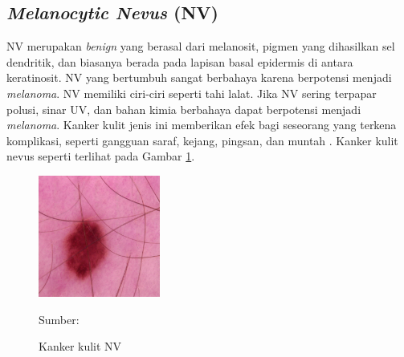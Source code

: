     \subsection{\textit{Melanocytic Nevus} (NV)}
    NV merupakan \textit{benign} yang berasal dari melanosit, pigmen yang dihasilkan sel dendritik, dan biasanya berada pada lapisan basal epidermis di antara keratinosit. NV yang bertumbuh sangat berbahaya karena berpotensi menjadi \textit{melanoma}. NV memiliki ciri-ciri seperti tahi lalat. Jika NV sering terpapar polusi, sinar UV, dan bahan kimia berbahaya dapat berpotensi menjadi \textit{melanoma}. Kanker kulit jenis ini memberikan efek bagi seseorang yang terkena komplikasi, seperti gangguan saraf, kejang, pingsan, dan muntah \citep{Fuadah2020a}. Kanker kulit nevus seperti terlihat pada Gambar \ref{fig:nv}.
    \begin{figure}[H] 
        \begin{center} 
            \includegraphics[width=4cm]{../img/Skin Cancer NV - Latex.jpg}
            \caption{Kanker kulit NV} 
            \label{fig:nv}
            Sumber: \citep{Codella2018,Combalia2019,Tschandl2018}
        \end{center} 
    \end{figure}

